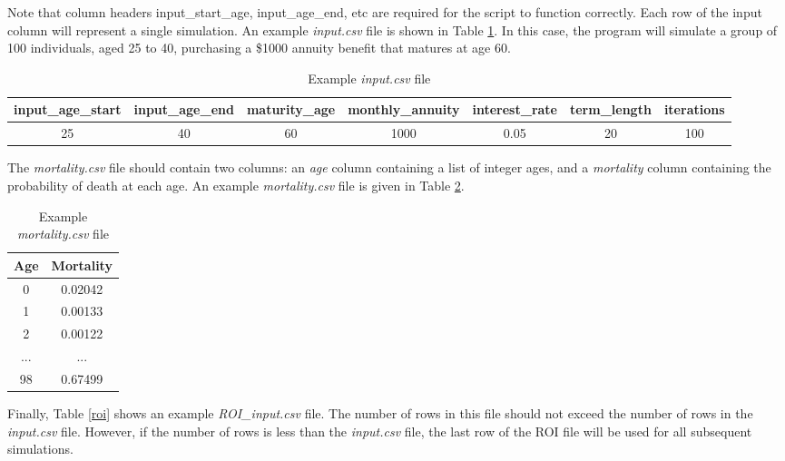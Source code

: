 \documentclass[12pt]{article}
\begin{document}
Note that column headers input\_start\_age, input\_age\_end, etc are required for the script to function correctly. Each row of the input column will represent a single simulation. An example \textit{input.csv} file is shown in Table \ref{example}. In this case, the program will simulate a group of 100 individuals, aged 25 to 40, purchasing a \$1000 annuity benefit that matures at age 60. 



\begin{table}[H]
	\begin{adjustwidth}{-.5in}{-.5in}  
		\footnotesize{
		\begin{tabular}{|c|c|c|c|c|c|c|}
			\hline
			\textbf{input\_age\_start} & \textbf{input\_age\_end} & \textbf{maturity\_age} & \textbf{monthly\_annuity} & \textbf{interest\_rate} & \textbf{term\_length} & \textbf{iterations} \\ \hline
			25 & 40 & 60 & 1000 & 0.05 & 20 & 100 \\ \hline
		\end{tabular}
		\label{example}
		\caption{Example \textit{input.csv} file}
	}
	\end{adjustwidth}
\end{table}

The \textit{mortality.csv} file should contain two columns: an \textit{age} column containing a list of integer ages, and a \textit{mortality} column containing the probability of death at each age. An example \textit{mortality.csv} file is given in Table \ref{mortality}. 

\begin{table}[H]
	\centering
	\begin{tabular}{|c|c|}
		\hline
		Age & Mortality \\ \hline
		0 & 0.02042 \\ \hline
		1 & 0.00133 \\ \hline
		2 & 0.00122 \\ \hline
		... & ... \\ \hline
		98 & 0.67499 \\ \hline
	\end{tabular}
	\caption{Example \textit{mortality.csv} file}
	\label{mortality}
\end{table}

Finally, Table \ref{roi} shows an example \textit{ROI\_input.csv} file. The number of rows in this file should not exceed the number of rows in the  \textit{input.csv} file. However, if the number of rows is less than the  \textit{input.csv} file, the last row of the ROI file will be used for all subsequent simulations. 
\end{document}
